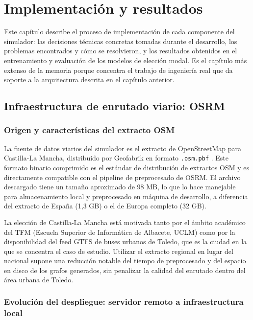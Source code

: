 \chapter{Implementación y resultados}
\label{ch:implementacion}

Este capítulo describe el proceso de implementación de cada componente del simulador: las decisiones técnicas concretas tomadas durante el desarrollo, los problemas encontrados y cómo se resolvieron, y los resultados obtenidos en el entrenamiento y evaluación de los modelos de elección modal. Es el capítulo más extenso de la memoria porque concentra el trabajo de ingeniería real que da soporte a la arquitectura descrita en el capítulo anterior.

\section{Infraestructura de enrutado viario: OSRM}
\label{sec:impl_osrm}

\subsection{Origen y características del extracto OSM}

La fuente de datos viarios del simulador es el extracto de OpenStreetMap para Castilla-La Mancha, distribuido por Geofabrik en formato \texttt{.osm.pbf} \cite{GeofabrikDownloads}. Este formato binario comprimido es el estándar de distribución de extractos OSM y es directamente compatible con el pipeline de preprocesado de OSRM. El archivo descargado tiene un tamaño aproximado de 98 MB, lo que lo hace manejable para almacenamiento local y preprocesado en máquina de desarrollo, a diferencia del extracto de España (1,3 GB) o el de Europa completo (32 GB).

La elección de Castilla-La Mancha está motivada tanto por el ámbito académico del TFM (Escuela Superior de Informática de Albacete, UCLM) como por la disponibilidad del feed GTFS de buses urbanos de Toledo, que es la ciudad en la que se concentra el caso de estudio. Utilizar el extracto regional en lugar del nacional supone una reducción notable del tiempo de preprocesado y del espacio en disco de los grafos generados, sin penalizar la calidad del enrutado dentro del área urbana de Toledo.

\subsection{Evolución del despliegue: servidor remoto a infraestructura local}

